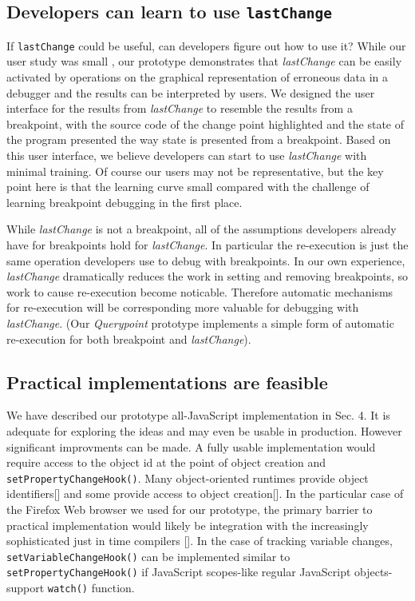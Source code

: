 \documentclass[runningheads,a4paper]{llncs}
\begin{document}
\subsection{Developers can learn to use \protect\texttt{lastChange}}

If \texttt{lastChange} could be useful, can developers figure out how
to use it? While our user study was small , our prototype demonstrates that
\textit{lastChange} can be easily activated by operations on the
graphical representation of erroneous data in a debugger and the 
results can be interpreted by users. We designed the
user interface for the results from \textit{lastChange} to resemble
the results from a breakpoint, with the source code of the change
point highlighted and the state of the program presented the way state
is presented from a breakpoint. Based on this user interface, we
believe developers can start to use \textit{lastChange} with minimal
training. Of course our users may not be representative, but the key point here
is that the learning curve small compared with the challenge of learning 
breakpoint debugging in the first place.

While \textit{lastChange} is not a breakpoint, 
all of the assumptions developers already have for breakpoints hold
for \textit{lastChange}. In particular the re-execution is just the
same operation developers use to debug with breakpoints. 
In our own experience, \textit{lastChange} dramatically reduces the work in
setting and removing breakpoints, so work to cause re-execution  become noticable.
Therefore automatic mechanisms
for re-execution will be corresponding more valuable for debugging
with \textit{lastChange}.  (Our \textit{Querypoint} prototype  
implements a simple form of automatic 
re-execution for both breakpoint and \textit{lastChange}).


\subsection{Practical implementations are feasible}

We have described our prototype all-JavaScript implementation in Sec. 4. It is adequate for 
exploring the ideas and may even be usable in production. However significant 
improvments can be made. A fully usable
implementation would require access to the object id at the point of
object creation and \texttt{setPropertyChangeHook()}. Many
object-oriented runtimes provide object identifiers[] and some
provide access to object creation[]. In the particular case of
the Firefox Web browser we used for our prototype, the primary barrier
to practical implementation would likely be integration with the
increasingly sophisticated just in time compilers []. In the case of
tracking variable changes, \texttt{setVariableChangeHook()} can be implemented
similar to \texttt{setPropertyChangeHook()} if JavaScript scopes-like regular 
JavaScript objects-support \texttt{watch()} function.
\end{document}
